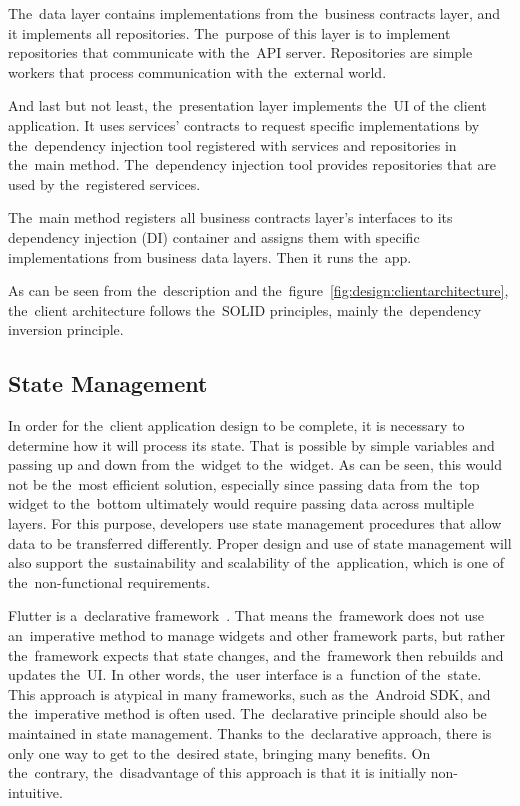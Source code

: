 The~data layer contains implementations from the~business contracts layer, and it implements all repositories.
The~purpose of this layer is to implement repositories that communicate with the~API server.
Repositories are simple workers that process communication with the~external world.

And last but not least, the~presentation layer implements the~UI of the client application.
It uses services' contracts to request specific implementations by the~dependency injection tool registered with services and repositories in the~main method.
The~dependency injection tool provides repositories that are used by the~registered services.

The~main method registers all business contracts layer's interfaces to its dependency injection (DI) container and assigns them with specific implementations from business data layers.
Then it runs the~app.

\pagebreak

As can be seen from the~description and the~figure~\ref{fig:design:clientarchitecture}, the~client architecture follows the~SOLID principles, mainly the~dependency inversion principle. 

\subsection{State Management}

In order for the~client application design to be complete, it is necessary to determine how it will process its state.
That is possible by simple variables and passing up and down from the~widget to the~widget.
As can be seen, this would not be the~most efficient solution, especially since passing data from the~top widget to the~bottom ultimately would require passing data across multiple layers.
For this purpose, developers use state management procedures that allow data to be transferred differently.
Proper design and use of state management will also support the~sustainability and scalability of the~application, which is one of the~non-functional requirements.

Flutter is a~declarative framework~\cite{a2022_flutter_declarative}.
That means the~framework does not use an~imperative method to manage widgets and other framework parts, but rather the~framework expects that state changes, and the~framework then rebuilds and updates the~UI.
In other words, the~user interface is a~function of the~state.
This approach is atypical in many frameworks, such as the~Android SDK, and the~imperative method is often used.
The~declarative principle should also be maintained in state management.
Thanks to the~declarative approach, there is only one way to get to the~desired state, bringing many benefits.
On the~contrary, the~disadvantage of this approach is that it is initially non-intuitive.

